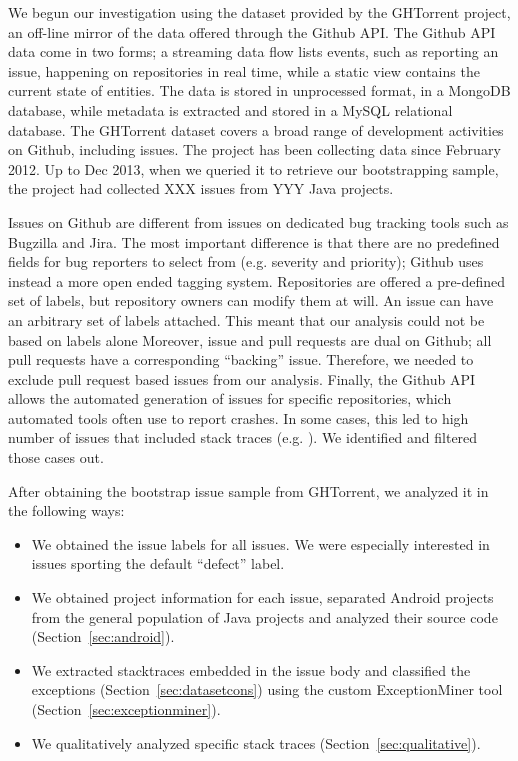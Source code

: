 \documentclass[conference]{IEEEtran}
\begin{document}
We begun our investigation using the dataset provided by the GHTorrent project, 
an off-line mirror of the data offered
through the Github API. The Github API data come in two forms; a streaming data flow lists events, 
such as reporting an issue, happening on repositories in real time, while a static view contains 
the current state of entities. The data is stored in unprocessed format, in a MongoDB database, 
while metadata is extracted and stored in a MySQL relational database. The GHTorrent dataset covers
a broad range of development activities on Github, including issues. The project has been collecting data since February 2012. Up to Dec 2013, when we queried it to retrieve our bootstrapping 
sample, the project had collected XXX issues from YYY Java projects.

Issues on Github are different from issues on dedicated bug tracking tools such as Bugzilla
and Jira. The most important difference is that there are no predefined fields for 
bug reporters to select from (e.g. severity and priority); Github uses instead a more open
ended tagging system. Repositories are offered a pre-defined set of labels, but repository
owners can modify them at will. An issue can have an arbitrary set of labels attached.
This meant that our analysis could not be based on labels alone 
Moreover, issue and pull requests are dual on Github; all pull requests have a corresponding 
``backing'' issue. Therefore, we needed to exclude pull request based issues from our analysis.
Finally, the Github API allows the automated generation of issues for specific repositories, 
which automated tools often use to report crashes. In some cases, this led to high number
of issues that included stack traces (e.g. ). We identified and filtered those cases out.

After obtaining the bootstrap issue sample from GHTorrent, we analyzed it in the following
ways:

\begin{itemize}

    \item We obtained the issue labels for all issues. We were especially interested in 
    issues sporting the default ``defect'' label.
    
    \item We obtained project information for each issue, separated Android projects from
    the general population of Java projects and analyzed their source code (Section~\ref{sec:android}).
    
    \item We extracted stacktraces embedded in the issue body and classified the exceptions 
    (Section~\ref{sec:datasetcons}) using the custom ExceptionMiner tool
    (Section~\ref{sec:exceptionminer}).
    
    \item We qualitatively analyzed specific stack traces (Section~\ref{sec:qualitative}).
    
\end{itemize}
\end{document}

